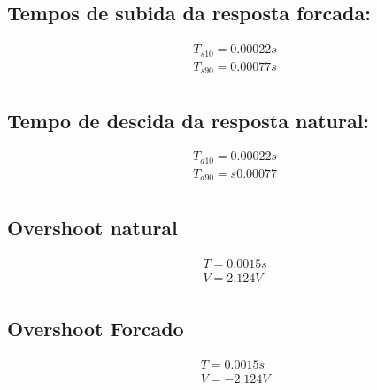 \documentclass[12pt,twoside, a4paper, twocolumn]{article}
\begin{document}
{\subsection{Tempos de subida da resposta forcada:}

\begin{equation*}
    \begin{align*}
         & T_{s10} = 0.00022s \\
         & T_{s90} = 0.00077s \\
    \end{align*}
\end{equation*}

\subsection{Tempo de descida da resposta natural:}

\begin{equation*}
    \begin{align*}
         & T_{d10} =  0.00022s  \\
         & T_{d90} = s  0.00077 \\
    \end{align*}
\end{equation*}

\subsection{Overshoot natural}

\begin{equation*}
    \begin{align*}
         & T = 0.0015s \\
         & V = 2.124V  \\
    \end{align*}
\end{equation*}

\subsection{Overshoot Forcado}

\begin{equation*}
    \begin{align*}
         & T = 0.0015s \\
         & V = -2.124V \\
    \end{align*}
\end{equation*}

}
\end{document}
